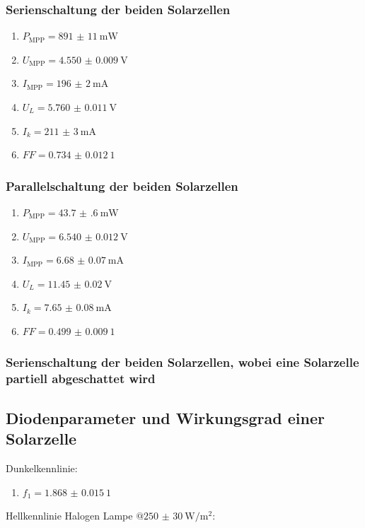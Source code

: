 \documentclass[12pt,english,ngerman]{scrartcl}
\begin{document}
\subsubsection{Serienschaltung der beiden Solarzellen}
\begin{enumerate}
	\item $P_\text{MPP} = \SI{891(11)}{\milli\watt}$
	\item $U_\text{MPP} = \SI{4.550(9)}{\volt}$
	\item $I_\text{MPP} = \SI{196(2)}{\milli\ampere}$
	\item $U_L = \SI{5.760(11)}{\volt}$
	\item $I_k = \SI{211(3)}{\milli\ampere}$
	\item $FF = \SI{0.734(12)}{1}$
\end{enumerate}

\subsubsection{Parallelschaltung der beiden Solarzellen}
\begin{enumerate}
	\item $P_\text{MPP} = \SI{43.7(6)}{\milli\watt}$
	\item $U_\text{MPP} = \SI{6.540(12)}{\volt}$
	\item $I_\text{MPP} = \SI{6.68(7)}{\milli\ampere}$
	\item $U_L = \SI{11.45(2)}{\volt}$
	\item $I_k = \SI{7.65(8)}{\milli\ampere}$
	\item $FF = \SI{0.499(9)}{1}$
\end{enumerate}

\subsubsection{Serienschaltung der beiden Solarzellen, wobei eine Solarzelle partiell abgeschattet wird}

\subsection{Diodenparameter und Wirkungsgrad einer Solarzelle}

Dunkelkennlinie:

\begin{enumerate}
	\item $f_1 = \SI{1.868(15)}{1}$
\end{enumerate}

Hellkennlinie Halogen Lampe $@\SI{250(30)}{\watt\per\meter\squared}$:
\end{document}
